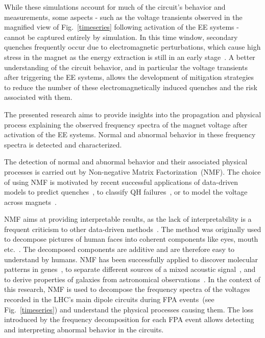 \documentclass[lettersize,journal]{IEEEtran}
\begin{document}
While these simulations account for much of the circuit's behavior and measurements, some aspects - such as the voltage transients observed in the magnified view of Fig.~\ref{timeseries} following activation of the EE systems - cannot be captured entirely by simulation.
In this time window, secondary quenches frequently occur due to electromagnetic perturbations, which cause high stress in the magnet as the energy extraction is still in an early stage~\cite{ravaioli2012}.
A better understanding of the circuit behavior, and in particular the voltage transients after triggering the EE systems, allows the development of mitigation strategies to reduce the number of these electromagnetically induced quenches and the risk associated with them.


The presented research aims to provide insights into the propagation and physical process explaining the observed frequency spectra of the magnet voltage after activation of the EE systems. 
Normal and abnormal behavior in these frequency spectra is detected and characterized. 

The detection of normal and abnormal behavior and their associated physical processes is carried out by Non-negative Matrix Factorization~(NMF). 
The choice of using NMF is motivated by recent successful applications of data-driven models to predict quenches~\cite{hoang2021intelliquench}, to classify QH failures~\cite{charifoulline2016overview}, or to model the voltage across magnets~\cite{wielgosz2017using}. 

NMF aims at providing interpretable results, as the lack of interpretability is a frequent criticism to other data-driven methods~\cite{goodman2017european,benitez1997artificial}.
The method was originally used to decompose pictures of human faces into coherent components like eyes, mouth etc.~\cite{Lee1999}. The decomposed components are additive and are therefore easy to understand by humans. 
NMF has been successfully applied to discover molecular patterns in genes~\cite{brunet2004metagenes}, to separate different sources of a mixed acoustic signal~\cite{sawada2013multichannel}, and to derive properties of galaxies from astronomical observations~\cite{blanton2007k}. 
In the context of this research, NMF is used to decompose the frequency spectra of the voltages recorded in the LHC's main dipole circuits during FPA events~(see Fig.~\ref{timeseries}) and understand the physical processes causing them. The loss introduced by the frequency decomposition for each FPA event allows detecting and interpreting abnormal behavior in the circuits.
\end{document}
